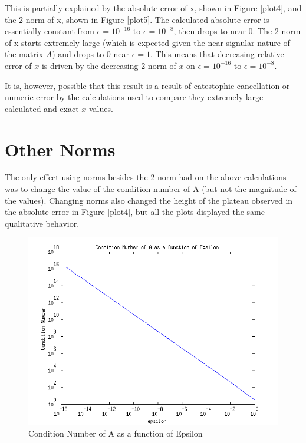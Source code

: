 \documentclass{article}
\begin{document}
This is partially explained by the absolute error of x, shown in Figure \ref{plot4}, and the 2-norm of x, shown in Figure \ref{plot5}. The calculated absolute error is essentially constant from \(\epsilon=10^{-16}\) to \(\epsilon=10^{-8}\), then drops to near 0. The 2-norm of x starts extremely large (which is expected given the near-signular nature of the matrix \(A\)) and drops to 0 near \( \epsilon = 1 \). This means that decreasing relative error of \(x\) is driven by the decreasing 2-norm of \(x\) on \(\epsilon=10^{-16}\) to \(\epsilon=10^{-8}\).

It is, however, possible that this result is a result of catestophic cancellation or numeric error by the calculations used to compare they extremely large calculated and exact \(x\) values.

\section{Other Norms}\label{norms}

The only effect using norms besides the 2-norm had on the above calculations was to change the value of the condition number of A (but not the magnitude of the values). Changing norms also changed the height of the plateau observed in the absolute error in Figure \ref{plot4}, but all the plots displayed the same qualitative behavior.

\begin{figure}
\centering
\includegraphics[width=1.0\textwidth]{plot1.png}
\caption{Condition Number of A as a function of Epsilon}
\label{plot1}
\end{figure}
\end{document}

